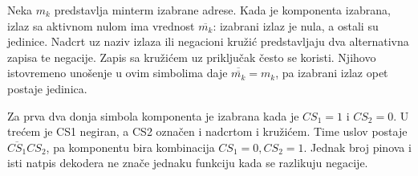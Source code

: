 
Neka \(m_k\) predstavlja minterm izabrane adrese. Kada je komponenta izabrana, izlaz sa aktivnom nulom ima vrednost \(\overline{m_k}\): izabrani izlaz je nula, a ostali su jedinice. Nadcrt uz naziv izlaza ili negacioni kružić predstavljaju dva alternativna zapisa te negacije. Zapis sa kružićem uz priključak često se koristi. Njihovo istovremeno unošenje u ovim simbolima daje \(\overline{\overline{m_k}}=m_k\), pa izabrani izlaz opet postaje jedinica.

Za prva dva donja simbola komponenta je izabrana kada je \(CS_1=1\) i \(CS_2=0\). U trećem je CS1 negiran, a CS2 označen i nadcrtom i kružićem. Time uslov postaje \(\overline{CS_1}CS_2\), pa komponentu bira kombinacija \(CS_1=0,CS_2=1\). Jednak broj pinova i isti natpis dekodera ne znače jednaku funkciju kada se razlikuju negacije.
